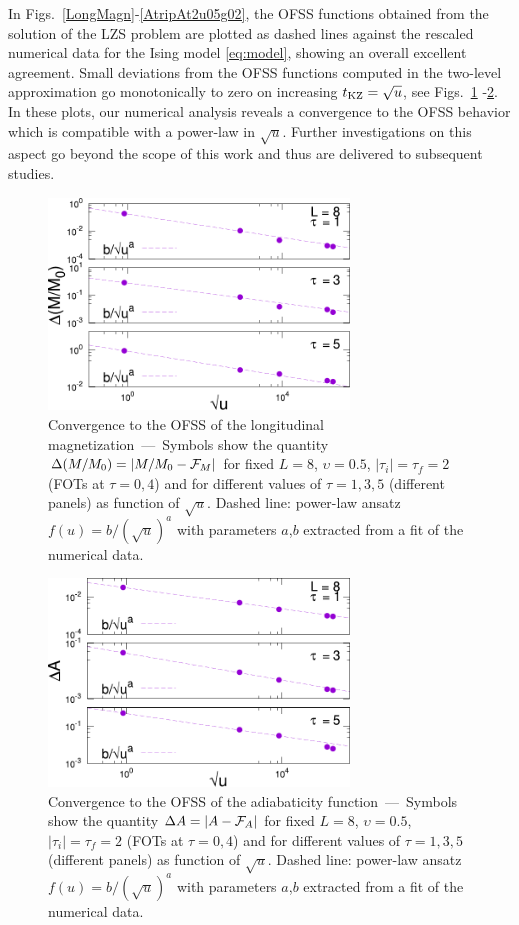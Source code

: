 In Figs.~\ref{LongMagn}-\ref{AtripAt2u05g02}, the OFSS functions obtained from the solution of the LZS problem are plotted as dashed lines against the rescaled numerical data for the Ising model \eqref{eq:model}, 
showing an overall excellent agreement. Small deviations from the OFSS functions computed in the two-level approximation go monotonically to zero on increasing $t_{\rm KZ}=\sqrt{u}$, see Figs.~\ref{fig:convergence-M} -\ref{fig:convergence-A}.\\
 In these plots, our numerical analysis reveals a convergence to the OFSS behavior which is compatible with a power-law in $\sqrt{u}$. Further investigations on this aspect go beyond the scope of this work and thus are delivered to subsequent studies.

	\begin{figure}[t]
\centering
		\includegraphics[width=8cm]{imm/sqrtuMconv.pdf}
\caption{Convergence to the OFSS of the longitudinal magnetization~---~Symbols show the quantity $\Delta(M/M_0)=|M/M_0-{\cal F}_M|$ for fixed $L=8$, $\upsilon=0.5$, $|\tau_i|=\tau_f=2$ (FOTs at $\tau=0,4$) and for different values of $\tau=1,3,5$ (different panels) as function of $\sqrt{u}$. Dashed line: power-law ansatz $f(u)=b/(\sqrt{u})^a$ with parameters $a$,$b$ extracted from a fit of the numerical data.}\label{fig:convergence-M}
	\end{figure}
\begin{figure}[t]
\centering
	\includegraphics[width=8cm]{imm/sqrtuAconv.pdf}
		\caption{Convergence to the OFSS of the adiabaticity function~---~Symbols show the quantity $\Delta A=|A-{\cal F}_A|$ for fixed $L=8$, $\upsilon=0.5$, $|\tau_i|=\tau_f=2$ (FOTs at $\tau=0,4$) and for different values of $\tau=1,3,5$ (different panels) as function of $\sqrt{u}$. Dashed line: power-law ansatz $f(u)=b/(\sqrt{u})^a$ with parameters $a$,$b$ extracted from a fit of the numerical data.}
		\label{fig:convergence-A}
	\end{figure}
